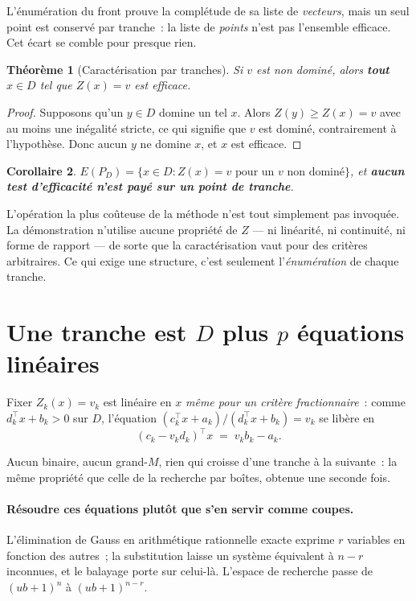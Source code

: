 \documentclass[12pt,a4paper]{report}
\newcommand{\Dset}{D}
\newcommand{\E}{E(P_D)}
\newcommand{\Z}{Z}
\theoremstyle{plain}
\newtheorem{theoreme}{Théorème}[chapter]
\newtheorem{corollaire}[theoreme]{Corollaire}
\theoremstyle{definition}
\begin{document}
L'énumération du front prouve la complétude de sa liste de \emph{vecteurs},
mais un seul point est conservé par tranche~: la liste de \emph{points} n'est
pas l'ensemble efficace.  Cet écart se comble pour presque rien.

\begin{theoreme}[Caractérisation par tranches]\label{th:tranche}
Si $v$ est non dominé, alors \textbf{tout} $x \in \Dset$ tel que $\Z(x) = v$
est efficace.
\end{theoreme}

\begin{proof}
Supposons qu'un $y \in \Dset$ domine un tel $x$.  Alors $\Z(y) \geqslant \Z(x)
= v$ avec au moins une inégalité stricte, ce qui signifie que $v$ est dominé,
contrairement à l'hypothèse.  Donc aucun $y$ ne domine $x$, et $x$ est efficace.
\end{proof}

\begin{corollaire}
$\E = \{x \in \Dset : \Z(x) = v \text{ pour un } v \text{ non dominé}\}$, et
\textbf{aucun test d'efficacité n'est payé sur un point de tranche}.
\end{corollaire}

\noindent
L'opération la plus coûteuse de la méthode n'est tout simplement pas invoquée.
La démonstration n'utilise aucune propriété de $\Z$ --- ni linéarité, ni
continuité, ni forme de rapport --- de sorte que la caractérisation vaut pour
des critères arbitraires.  Ce qui exige une structure, c'est seulement
l'\emph{énumération} de chaque tranche.

\section{Une tranche est \texorpdfstring{$\Dset$}{D} plus \texorpdfstring{$p$}{p} équations linéaires}
\label{sec:elim}

Fixer $\Z_k(x) = v_k$ est linéaire en $x$ \emph{même pour un critère
fractionnaire}~: comme $d_k^{\top}x + b_k > 0$ sur $\Dset$, l'équation
$(c_k^{\top}x + a_k)/(d_k^{\top}x + b_k) = v_k$ se libère en
\begin{equation}\label{eq:tranche}
  (c_k - v_k d_k)^{\top} x \;=\; v_k b_k - a_k .
\end{equation}

Aucun binaire, aucun grand-$M$, rien qui croisse d'une tranche à la suivante~:
la même propriété que celle de la recherche par boîtes, obtenue une seconde
fois.

\paragraph{Résoudre ces équations plutôt que s'en servir comme coupes.}
L'élimination de Gauss en arithmétique rationnelle exacte exprime $r$ variables
en fonction des autres~; la substitution laisse un système équivalent à $n - r$
inconnues, et le balayage porte sur celui-là.  L'espace de recherche passe de
$(ub+1)^n$ à $(ub+1)^{n-r}$.
\end{document}
